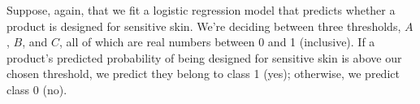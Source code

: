 \documentclass[twoside,12pt]{article}
\begin{document}
\begin{probset}
\begin{prob}[(10 pts)]

\vspace{3.5in}



    












\end{prob}

\newpage

\begin{prob}[(8 pts)]

Suppose, again, that we fit a logistic regression model that predicts whether a product is designed for sensitive skin. We're deciding between three thresholds, $A$, $B$, and $C$, all of which are real numbers between 0 and 1 (inclusive). If a product's predicted probability of being designed for sensitive skin is above our chosen threshold, we predict they belong to class 1 (yes); otherwise, we predict class 0 (no).


\end{prob}
\end{probset}
\end{document}
